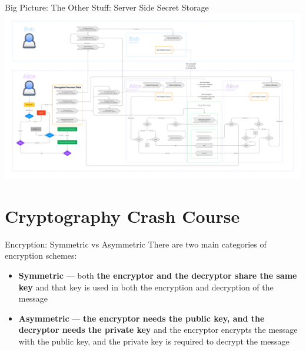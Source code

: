 \documentclass{beeper}
\begin{document}
\begin{frame}{Big Picture: The Other Stuff: Server Side Secret Storage}
    \includegraphics[width=\textwidth]{images/other-stuff-ssss}

\end{frame}

\section{Cryptography Crash Course}

\begin{frame}{Encryption: Symmetric vs Asymmetric}
    There are two main categories of encryption schemes:

    \begin{itemize}
        \item \textbf{Symmetric} --- both \textbf{the encryptor and the
            decryptor share the same key} and that key is used in both the
            encryption and decryption of the message
            \pause
        \item \textbf{Asymmetric} --- \textbf{the encryptor needs the public
            key, and the decryptor needs the private key} and the encryptor
            encrypts the message with the public key, and the private key is
            required to decrypt the message
    \end{itemize}
\end{frame}
\end{document}
